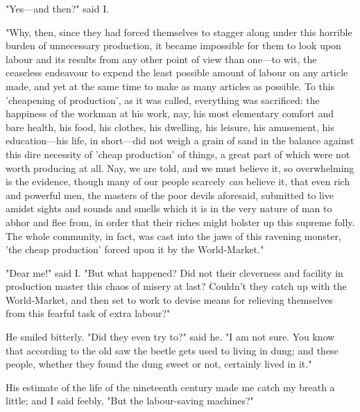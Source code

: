 "Yes---and then?" said I.

"Why, then, since they had forced themselves to stagger along under this
horrible burden of unnecessary production, it became impossible for them
to look upon labour and its results from any other point of view than
one---to wit, the ceaseless endeavour to expend the least possible
amount of labour on any article made, and yet at the same time to make
as many articles as possible. To this 'cheapening of production', as it
was called, everything was sacrificed: the happiness of the workman at
his work, nay, his most elementary comfort and bare health, his food,
his clothes, his dwelling, his leisure, his amusement, his
education---his life, in short---did not weigh a grain of sand in the
balance against this dire necessity of 'cheap production' of things, a
great part of which were not worth producing at all. Nay, we are told,
and we must believe it, so overwhelming is the evidence, though many of
our people scarcely \emph{can} believe it, that even rich and powerful
men, the masters of the poor devils aforesaid, submitted to live amidst
sights and sounds and smells which it is in the very nature of man to
abhor and flee from, in order that their riches might bolster up this
supreme folly. The whole community, in fact, was cast into the jaws of
this ravening monster, 'the cheap production' forced upon it by the
World-Market."

"Dear me!" said I. "But what happened? Did not their cleverness and
facility in production master this chaos of misery at last? Couldn't
they catch up with the World-Market, and then set to work to devise
means for relieving themselves from this fearful task of extra labour?"

He smiled bitterly. "Did they even try to?" said he. "I am not sure. You
know that according to the old saw the beetle gets used to living in
dung; and these people, whether they found the dung sweet or not,
certainly lived in it."

His estimate of the life of the nineteenth century made me catch my
breath a little; and I said feebly, "But the labour-saving machines?"


